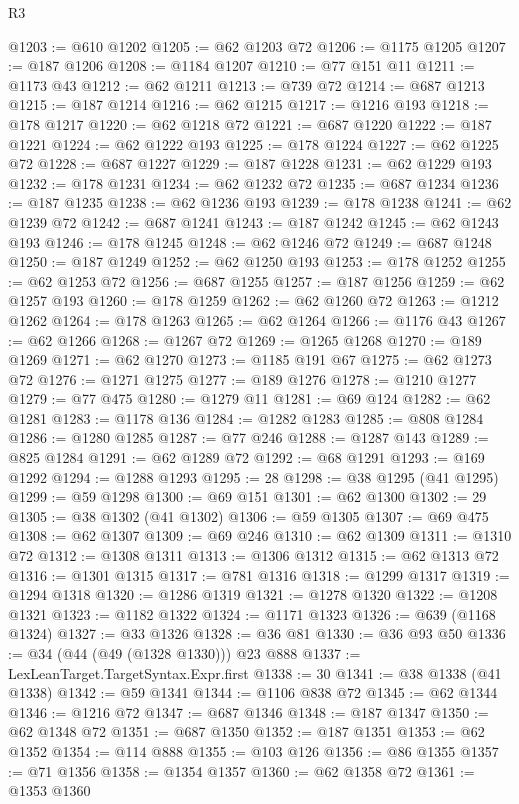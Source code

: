 \begin{lexlean}{R3}
\begin{coremodule}
@1203 := @610 @1202
@1205 := @62 @1203 @72
@1206 := @1175 @1205
@1207 := @187 @1206
@1208 := @1184 @1207
@1210 := @77 @151 @11
@1211 := @1173 @43
@1212 := @62 @1211
@1213 := @739 @72
@1214 := @687 @1213
@1215 := @187 @1214
@1216 := @62 @1215
@1217 := @1216 @193
@1218 := @178 @1217
@1220 := @62 @1218 @72
@1221 := @687 @1220
@1222 := @187 @1221
@1224 := @62 @1222 @193
@1225 := @178 @1224
@1227 := @62 @1225 @72
@1228 := @687 @1227
@1229 := @187 @1228
@1231 := @62 @1229 @193
@1232 := @178 @1231
@1234 := @62 @1232 @72
@1235 := @687 @1234
@1236 := @187 @1235
@1238 := @62 @1236 @193
@1239 := @178 @1238
@1241 := @62 @1239 @72
@1242 := @687 @1241
@1243 := @187 @1242
@1245 := @62 @1243 @193
@1246 := @178 @1245
@1248 := @62 @1246 @72
@1249 := @687 @1248
@1250 := @187 @1249
@1252 := @62 @1250 @193
@1253 := @178 @1252
@1255 := @62 @1253 @72
@1256 := @687 @1255
@1257 := @187 @1256
@1259 := @62 @1257 @193
@1260 := @178 @1259
@1262 := @62 @1260 @72
@1263 := @1212 @1262
@1264 := @178 @1263
@1265 := @62 @1264
@1266 := @1176 @43
@1267 := @62 @1266
@1268 := @1267 @72
@1269 := @1265 @1268
@1270 := @189 @1269
@1271 := @62 @1270
@1273 := @1185 @191 @67
@1275 := @62 @1273 @72
@1276 := @1271 @1275
@1277 := @189 @1276
@1278 := @1210 @1277
@1279 := @77 @475
@1280 := @1279 @11
@1281 := @69 @124
@1282 := @62 @1281
@1283 := @1178 @136
@1284 := @1282 @1283
@1285 := @808 @1284
@1286 := @1280 @1285
@1287 := @77 @246
@1288 := @1287 @143
@1289 := @825 @1284
@1291 := @62 @1289 @72
@1292 := @68 @1291
@1293 := @169 @1292
@1294 := @1288 @1293
@1295 := 28
@1298 := @38 @1295 (@41 @1295)
@1299 := @59 @1298
@1300 := @69 @151
@1301 := @62 @1300
@1302 := 29
@1305 := @38 @1302 (@41 @1302)
@1306 := @59 @1305
@1307 := @69 @475
@1308 := @62 @1307
@1309 := @69 @246
@1310 := @62 @1309
@1311 := @1310 @72
@1312 := @1308 @1311
@1313 := @1306 @1312
@1315 := @62 @1313 @72
@1316 := @1301 @1315
@1317 := @781 @1316
@1318 := @1299 @1317
@1319 := @1294 @1318
@1320 := @1286 @1319
@1321 := @1278 @1320
@1322 := @1208 @1321
@1323 := @1182 @1322
@1324 := @1171 @1323
@1326 := @639 (@1168 @1324)
@1327 := @33 @1326
@1328 := @36 @81
@1330 := @36 @93 @50
@1336 := @34 (@44 (@49 (@1328 @1330))) @23 @888
@1337 := LexLeanTarget.TargetSyntax.Expr.first
@1338 := 30
@1341 := @38 @1338 (@41 @1338)
@1342 := @59 @1341
@1344 := @1106 @838 @72
@1345 := @62 @1344
@1346 := @1216 @72
@1347 := @687 @1346
@1348 := @187 @1347
@1350 := @62 @1348 @72
@1351 := @687 @1350
@1352 := @187 @1351
@1353 := @62 @1352
@1354 := @114 @888
@1355 := @103 @126
@1356 := @86 @1355
@1357 := @71 @1356
@1358 := @1354 @1357
@1360 := @62 @1358 @72
@1361 := @1353 @1360

\end{coremodule}
\end{lexlean}

